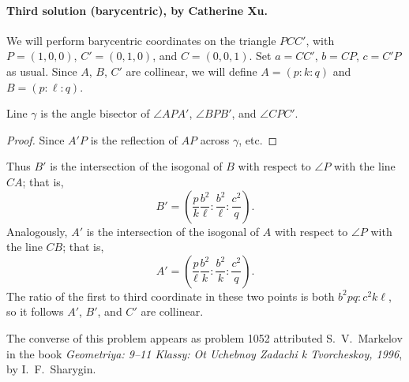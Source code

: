 \documentclass[11pt]{scrartcl}
\begin{document}
\paragraph{Third solution (barycentric), by Catherine Xu.}
We will perform barycentric coordinates on the triangle $PCC'$,
with $P=(1,0,0)$, $C'=(0,1,0)$, and $C=(0,0,1)$.
Set $a = CC'$, $b = CP$, $c = C'P$ as usual.
Since $A$, $B$, $C'$ are collinear,
we will define $A = (p : k : q)$ and $B = (p : \ell : q)$.

\begin{claim*}
  Line $\gamma$ is the angle bisector of
  $\angle APA' $, $\angle BPB'$, and $\angle CPC'$.
\end{claim*}
\begin{proof}
  Since $A'P$ is the reflection of $AP$ across $\gamma$, etc.
\end{proof}

Thus $B'$ is the intersection of the isogonal of $B$ with respect to $\angle P$
with the line $CA$; that is,
\[ B' = \left( \frac pk \frac{b^2}{\ell}
  : \frac{b^2}{\ell} : \frac{c^2}{q} \right). \]
Analogously, $A'$ is the intersection of the isogonal of $A$ with respect to $\angle P$
with the line $CB$; that is,
\[ A' = \left( \frac{p}{\ell} \frac{b^2}{k}
    : \frac{b^2}{k} : \frac{c^2}{q} \right). \]
The ratio of the first to third coordinate in these two points
is both $b^2pq : c^2k\ell$, so it follows $A'$, $B'$, and $C'$ are collinear.

\begin{remark*}
  The converse of this problem appears as problem 1052
  attributed S.\ V.\ Markelov in the book
  \emph{Geometriya: 9--11 Klassy: Ot Uchebnoy Zadachi k Tvorcheskoy, 1996},
  by I.\ F.\ Sharygin.
\end{remark*}
\pagebreak
\end{document}
